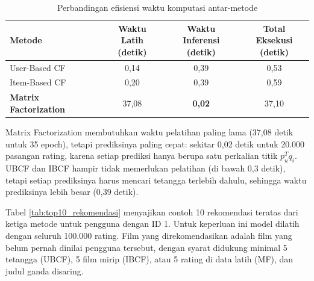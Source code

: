 \begin{table}[htbp]
\centering
\caption{Perbandingan efisiensi waktu komputasi antar-metode}
\label{tab:waktu_komputasi}
\footnotesize
\setlength{\tabcolsep}{4pt}
\begin{tabular}{l c c c}
\toprule
\textbf{Metode} & \shortstack{\textbf{Waktu Latih}\\\textbf{(detik)}} & \shortstack{\textbf{Waktu Inferensi}\\\textbf{(detik)}} & \shortstack{\textbf{Total Eksekusi}\\\textbf{(detik)}} \\
\midrule
User-Based CF & 0,14 & 0,39 & 0,53 \\
Item-Based CF & 0,20 & 0,39 & 0,59 \\
\textbf{Matrix Factorization} & 37,08 & \textbf{0,02} & 37,10 \\
\bottomrule
\end{tabular}
\end{table}

Matrix Factorization membutuhkan waktu pelatihan paling lama (37,08 detik untuk 35 epoch), tetapi prediksinya paling cepat: sekitar 0,02 detik untuk 20.000 pasangan rating, karena setiap prediksi hanya berupa satu perkalian titik $p_u^T q_i$. UBCF dan IBCF hampir tidak memerlukan pelatihan (di bawah 0,3 detik), tetapi setiap prediksinya harus mencari tetangga terlebih dahulu, sehingga waktu prediksinya lebih besar (0,39 detik).

Tabel \ref{tab:top10_rekomendasi} menyajikan contoh 10 rekomendasi teratas dari ketiga metode untuk pengguna dengan ID 1. Untuk keperluan ini model dilatih dengan seluruh 100.000 rating. Film yang direkomendasikan adalah film yang belum pernah dinilai pengguna tersebut, dengan syarat didukung minimal 5 tetangga (UBCF), 5 film mirip (IBCF), atau 5 rating di data latih (MF), dan judul ganda disaring.


